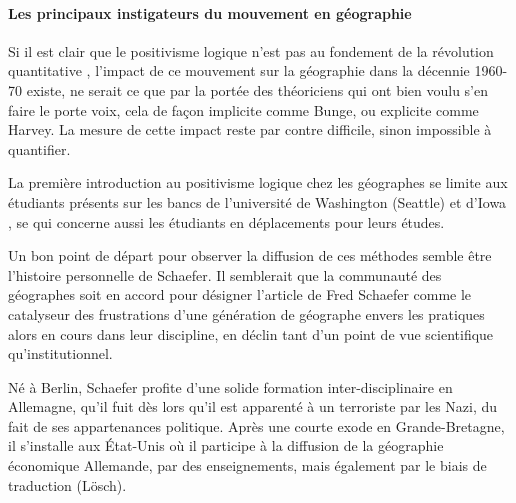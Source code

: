 

\paragraph{Les principaux instigateurs du mouvement en géographie}

Si il est clair que le positivisme logique n'est pas au fondement de la révolution quantitative \autocite{Claval2003}, l'impact de ce mouvement sur la géographie dans la décennie 1960-70 existe, ne serait ce que par la portée des théoriciens qui ont bien voulu s'en faire le porte voix, cela de façon implicite comme Bunge, ou explicite comme Harvey. La mesure de cette impact reste par contre difficile, sinon impossible à quantifier. 

La première introduction au positivisme logique chez les géographes se limite aux étudiants présents sur les bancs de l'université de Washington (Seattle) et d'Iowa \autocite[554]{Barnes2001a} \autocite[120-121]{Unwin1992}, se qui concerne aussi les étudiants en déplacements pour leurs études.

Un bon point de départ pour observer la diffusion de ces méthodes semble être l'histoire personnelle de Schaefer. Il semblerait que la communauté des géographes soit en accord \autocite[15]{Louail2010} pour désigner l'article de Fred Schaefer \autocite{Schaefer1953} comme le catalyseur des frustrations d'une génération de géographe envers les pratiques alors en cours dans leur discipline, en déclin tant d'un point de vue scientifique qu’institutionnel.

Né à Berlin, Schaefer profite d'une solide formation inter-disciplinaire en Allemagne, qu'il fuit dès lors qu'il est apparenté à un terroriste par les Nazi, du fait de ses appartenances politique. Après une courte exode en Grande-Bretagne, il s'installe aux État-Unis où il participe à la diffusion de la géographie économique Allemande, par des enseignements, mais également par le biais de traduction (Lösch). \autocite{Bunge1979}

